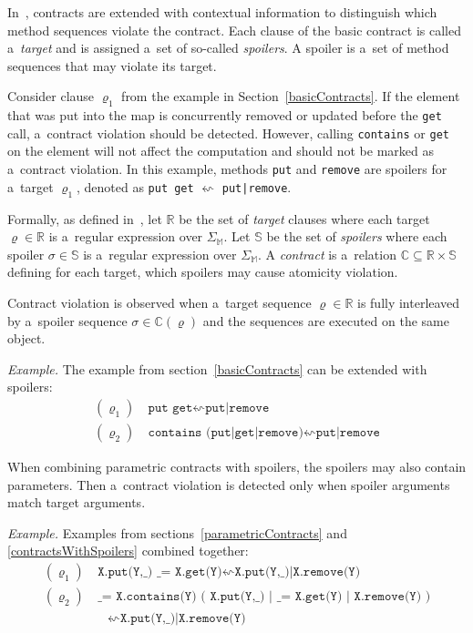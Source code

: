 In~\cite{contracts}, contracts are extended with contextual information to
distinguish which method sequences violate the contract. Each clause of the
basic contract is called a~\emph{target} and is assigned a~set of so-called
\emph{spoilers}. A spoiler is a~set of method sequences that may violate its
target.

Consider clause $\varrho_1$ from the example in Section~\ref{basicContracts}. If
the element that was put into the map is concurrently removed or updated before
the \texttt{get} call, a~contract violation should be detected.  However,
calling \texttt{contains} or \texttt{get} on the element will not affect the
computation and should not be marked as a~contract violation. In this example,
methods \texttt{put} and \texttt{remove} are spoilers for a~target
$\varrho_1$, denoted as \texttt{put get} $\leftsquigarrow$ \texttt{put|remove}.


Formally, as defined in~\cite{contracts}, let $\mathbb{R}$ be the set of
\emph{target} clauses where each target $\varrho \in \mathbb{R}$ is a~regular
expression over $\Sigma_\mathbb{M}$. Let $\mathbb{S}$ be the set of
\emph{spoilers} where each spoiler $\sigma \in \mathbb{S}$ is a~regular
expression over $\Sigma_\mathbb{M}$. A \emph{contract} is a~relation $\mathbb{C}
\subseteq \mathbb{R} \times \mathbb{S}$ defining for each target, which spoilers
may cause atomicity violation.

Contract violation is observed when a~target sequence $\varrho \in \mathbb{R}$
is fully interleaved by a~spoiler sequence $\sigma \in \mathbb{C}(\varrho)$ and
the sequences are executed on the same object.

\emph{Example.} The example from section~\ref{basicContracts} can be extended
with spoilers:
\begin{align*}
    (\varrho_1) &\ \texttt{put get} \leftsquigarrow \texttt{put|remove}\\
    (\varrho_2) &\ \texttt{contains (put|get|remove)} \leftsquigarrow
    \texttt{put|remove}
\end{align*}

When combining parametric contracts with spoilers, the spoilers may also contain
parameters. Then a~contract violation is detected only when spoiler arguments
match target arguments.

\emph{Example.} Examples from sections~\ref{parametricContracts} and
\ref{contractsWithSpoilers} combined together:
\begin{align*}
    (\varrho_1) &\ \texttt{X.put(Y,\_) \_ = X.get(Y)} \leftsquigarrow
    \texttt{X.put(Y,\_)|X.remove(Y)}\\
    (\varrho_2) &\ \texttt{\_ = X.contains(Y) ( X.put(Y,\_) | \_ = X.get(Y) |
    X.remove(Y) )}\\
    &\quad \leftsquigarrow \texttt{X.put(Y,\_)|X.remove(Y)}
\end{align*}


